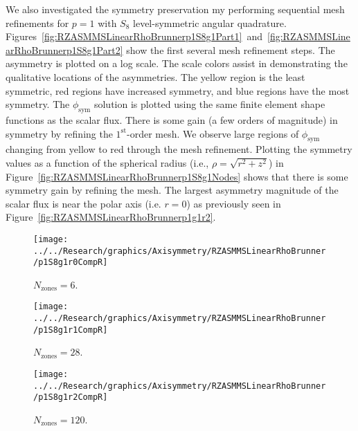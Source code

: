 \documentclass[12pt]{article}
\begin{document}
We also investigated the symmetry preservation my performing sequential mesh refinements for $p=1$ with $S_8$ level-symmetric angular quadrature. Figures~\ref{fig:RZASMMSLinearRhoBrunnerp1S8g1Part1}~and~\ref{fig:RZASMMSLinearRhoBrunnerp1S8g1Part2} show the first several mesh refinement steps. The asymmetry is plotted on a log scale. The scale colors assist in demonstrating the qualitative locations of the asymmetries. The yellow region is the least symmetric, red regions have increased symmetry, and blue regions have the most symmetry. The $\phi_\text{sym}$ solution is plotted using the same finite element shape functions as the scalar flux. There is some gain (a few orders of magnitude) in symmetry by refining the $1^\text{st}$-order mesh. We observe large regions of $\phi_\text{sym}$ changing from yellow to red through the mesh refinement. Plotting the symmetry values as a function of the spherical radius (i.e., $\rho=\sqrt{r^2+z^2}$) in Figure~\ref{fig:RZASMMSLinearRhoBrunnerp1S8g1Nodes} shows that there is some symmetry gain by refining the mesh. The largest asymmetry magnitude of the scalar flux is near the polar axis (i.e. $r=0$) as previously seen in Figure~\ref{fig:RZASMMSLinearRhoBrunnerp1g1r2}.

\begin{sidewaysfigure}[!htb]
\centering
\begin{subfigure}{0.33\textwidth}
\texttt{[image: ../../Research/graphics/Axisymmetry/RZASMMSLinearRhoBrunner/p1S8g1r0CompR]}
\caption{$N_\text{zones}=6$.}
\end{subfigure}%
\begin{subfigure}{0.33\textwidth}
\texttt{[image: ../../Research/graphics/Axisymmetry/RZASMMSLinearRhoBrunner/p1S8g1r1CompR]}
\caption{$N_\text{zones}=28$.}
\end{subfigure}%
\begin{subfigure}{0.33\textwidth}
\texttt{[image: ../../Research/graphics/Axisymmetry/RZASMMSLinearRhoBrunner/p1S8g1r2CompR]}
\caption{$N_\text{zones}=120$.}
\end{subfigure}
\caption{Relative asymmetry for $p=1$ finite elements on a $1^\text{st}$-order mesh for $S_8$ level-symmetric angular quadrature for $N_\text{zones}=\{6,28,120\}$.}
\label{fig:RZASMMSLinearRhoBrunnerp1S8g1Part1}
\end{sidewaysfigure}
\end{document}
